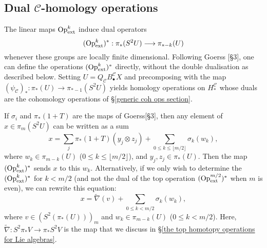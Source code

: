 \documentclass[11pt]{amsart}
\theoremstyle{plain}
\theoremstyle{definition}
\renewcommand{\to}{\longrightarrow}
\newcommand{\calC}{\mathcal{C}}
\theoremstyle{plain}
\newcommand{\ExtCohOp}{\textup{Op}_\textup{ext}}
\begin{document}
\begin{Conventions and notation}
\subsection{Dual $\calC$-homology operations}
The linear maps $\ExtCohOp^k$ induce dual operators
\[(\ExtCohOp^k)^*:\pi_*(S^2U)\to \pi_{*-k}(U)\]
whenever these groups are locally finite dimensional. Following Goerss [\S3], one can define the operations $(\ExtCohOp^k)^*$ directly, without the double dualisation as described below. Setting $U=Q_{\calC}B_\bullet^{\calC}X$ and precomposing with the map $(\psi_\calC)_*:\pi_*(U)\to\pi_{*-1}(S^2U)$ yields homology operations on $H_*^\calC$ whose duals are the cohomology operations of \S\ref{generic coh ops section}.

If $\sigma_i$ and $\pi_*(1+T)$ are the maps of Goerss[\S3], then any element of $x\in \pi_m(S^2U)$ can be written as a sum
\[x=\sum_j\pi_*(1+T)(y_j\otimes z_j)+\sum_{0\leq k\leq \lfloor m/2\rfloor}\sigma_k(w_k),\]
where $w_k\in \pi_{m-k}(U)$ ($0\leq k\leq\lfloor m/2\rfloor$), and $y_j,z_j\in \pi_{*}(U)$.
Then the map $(\ExtCohOp^k)^*$ sends $x$ to this $w_k$. Alternatively, if we only wish to determine the $(\ExtCohOp^k)^*$ for $k<m/2$ (and not the dual of the top operation $(\ExtCohOp^{m/2})^*$ when $m$ is even), we can rewrite this equation: 
\[x=\widetilde{\nabla}(v)+\sum_{0\leq k< m/2}\sigma_k(w_k),\]
where $v\in(S^2(\pi_*(U)))_{m}$ and $w_k\in \pi_{m-k}(U)$ ($0\leq k<m/2$). Here, $\widetilde{\nabla}:S^2\pi_*V\to \pi_*S^2V$ is the map that we discuss in \S\ref{the top homotopy operations for Lie algebras}.





\end{Conventions and notation}
\end{document}
